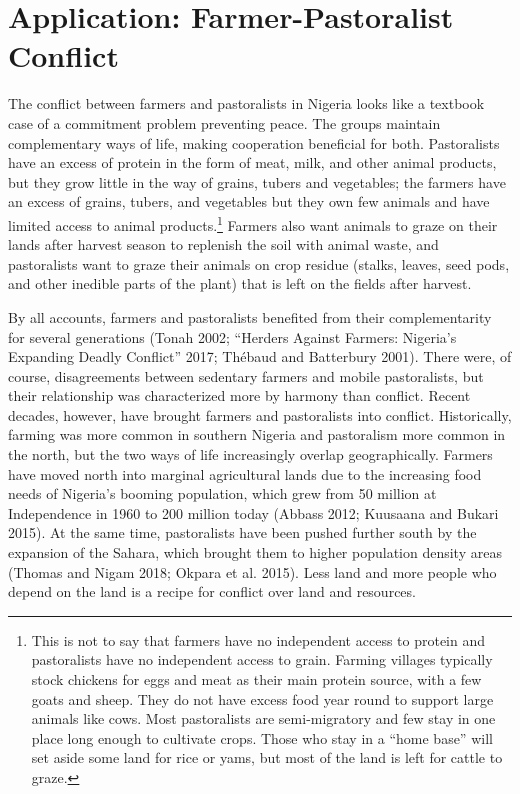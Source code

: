 \documentclass[11pt]{article}
\begin{document}
\hypertarget{application-farmer-pastoralist-conflict}{%
\section{Application: Farmer-Pastoralist
Conflict}\label{application-farmer-pastoralist-conflict}}

The conflict between farmers and pastoralists in Nigeria looks like a
textbook case of a commitment problem preventing peace. The groups
maintain complementary ways of life, making cooperation beneficial for
both. Pastoralists have an excess of protein in the form of meat, milk,
and other animal products, but they grow little in the way of grains,
tubers and vegetables; the farmers have an excess of grains, tubers, and
vegetables but they own few animals and have limited access to animal
products.\footnote{This is not to say that farmers have no independent
  access to protein and pastoralists have no independent access to
  grain. Farming villages typically stock chickens for eggs and meat as
  their main protein source, with a few goats and sheep. They do not
  have excess food year round to support large animals like cows. Most
  pastoralists are semi-migratory and few stay in one place long enough
  to cultivate crops. Those who stay in a ``home base'' will set aside
  some land for rice or yams, but most of the land is left for cattle to
  graze.} Farmers also want animals to graze on their lands after
harvest season to replenish the soil with animal waste, and pastoralists
want to graze their animals on crop residue (stalks, leaves, seed pods,
and other inedible parts of the plant) that is left on the fields after
harvest.

By all accounts, farmers and pastoralists benefited from their
complementarity for several generations (Tonah 2002; ``Herders Against
Farmers: Nigeria's Expanding Deadly Conflict'' 2017; Thébaud and
Batterbury 2001). There were, of course, disagreements between sedentary
farmers and mobile pastoralists, but their relationship was
characterized more by harmony than conflict. Recent decades, however,
have brought farmers and pastoralists into conflict. Historically,
farming was more common in southern Nigeria and pastoralism more common
in the north, but the two ways of life increasingly overlap
geographically. Farmers have moved north into marginal agricultural
lands due to the increasing food needs of Nigeria's booming population,
which grew from 50 million at Independence in 1960 to 200 million today
(Abbass 2012; Kuusaana and Bukari 2015). At the same time, pastoralists
have been pushed further south by the expansion of the Sahara, which
brought them to higher population density areas (Thomas and Nigam 2018;
Okpara et al. 2015). Less land and more people who depend on the land is
a recipe for conflict over land and resources.
\end{document}
